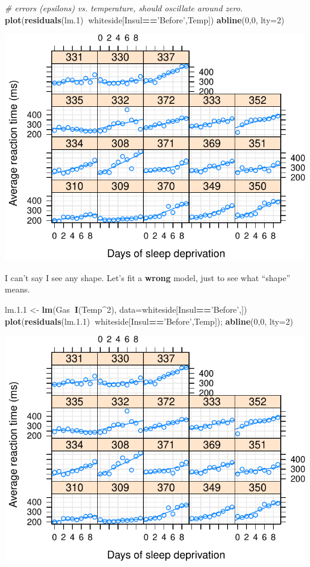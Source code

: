 \documentclass[]{book}
\newenvironment{Shaded}{\begin{snugshade}}{\end{snugshade}}
\newcommand{\CommentTok}[1]{\textcolor[rgb]{0.56,0.35,0.01}{\textit{#1}}}
\newcommand{\DataTypeTok}[1]{\textcolor[rgb]{0.13,0.29,0.53}{#1}}
\newcommand{\DecValTok}[1]{\textcolor[rgb]{0.00,0.00,0.81}{#1}}
\newcommand{\FloatTok}[1]{\textcolor[rgb]{0.00,0.00,0.81}{#1}}
\newcommand{\KeywordTok}[1]{\textcolor[rgb]{0.13,0.29,0.53}{\textbf{#1}}}
\newcommand{\NormalTok}[1]{#1}
\newcommand{\OperatorTok}[1]{\textcolor[rgb]{0.81,0.36,0.00}{\textbf{#1}}}
\newcommand{\StringTok}[1]{\textcolor[rgb]{0.31,0.60,0.02}{#1}}
\theoremstyle{definition}
\theoremstyle{definition}
\theoremstyle{definition}
\theoremstyle{remark}
\begin{document}
\begin{Shaded}
\begin{Highlighting}[]
\CommentTok{# errors (epsilons) vs. temperature, should oscillate around zero.}
\KeywordTok{plot}\NormalTok{(}\KeywordTok{residuals}\NormalTok{(lm}\FloatTok{.1}\NormalTok{)}\OperatorTok{~}\NormalTok{whiteside[Insul}\OperatorTok{==}\StringTok{'Before'}\NormalTok{,Temp])}
\KeywordTok{abline}\NormalTok{(}\DecValTok{0}\NormalTok{,}\DecValTok{0}\NormalTok{, }\DataTypeTok{lty=}\DecValTok{2}\NormalTok{)}
\end{Highlighting}
\end{Shaded}

\includegraphics[width=0.5\linewidth]{Rcourse_files/figure-latex/unnamed-chunk-161-1}

I can't say I see any shape.
Let's fit a \textbf{wrong} model, just to see what ``shape'' means.

\begin{Shaded}
\begin{Highlighting}[]
\NormalTok{lm.}\FloatTok{1.1}\NormalTok{ <-}\StringTok{ }\KeywordTok{lm}\NormalTok{(Gas}\OperatorTok{~}\KeywordTok{I}\NormalTok{(Temp}\OperatorTok{^}\DecValTok{2}\NormalTok{), }\DataTypeTok{data=}\NormalTok{whiteside[Insul}\OperatorTok{==}\StringTok{'Before'}\NormalTok{,])}
\KeywordTok{plot}\NormalTok{(}\KeywordTok{residuals}\NormalTok{(lm.}\FloatTok{1.1}\NormalTok{)}\OperatorTok{~}\NormalTok{whiteside[Insul}\OperatorTok{==}\StringTok{'Before'}\NormalTok{,Temp]); }\KeywordTok{abline}\NormalTok{(}\DecValTok{0}\NormalTok{,}\DecValTok{0}\NormalTok{, }\DataTypeTok{lty=}\DecValTok{2}\NormalTok{)}
\end{Highlighting}
\end{Shaded}

\includegraphics[width=0.5\linewidth]{Rcourse_files/figure-latex/unnamed-chunk-162-1}
\end{document}
